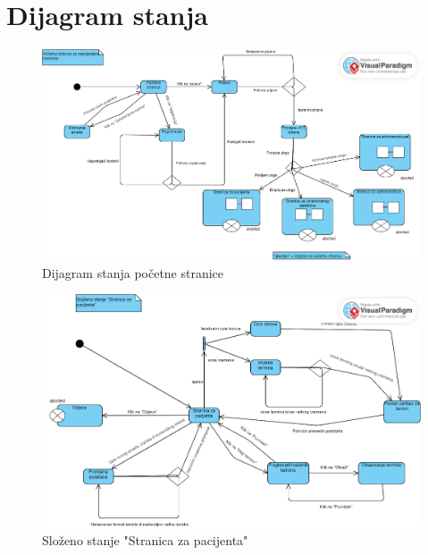 			
			
			\eject
		
		\section{Dijagram stanja}
			
			
		\begin{figure}[H]
			\includegraphics[scale=0.4]{slike/DijagramStanja1.PNG} %
			\centering
			\caption{Dijagram stanja početne stranice}
			\label{fig:promjene}
		\end{figure}
		
			\begin{figure}[H]
			\includegraphics[scale=0.4]{slike/DijagramStanja2.PNG} %
			\centering
			\caption{Složeno stanje "Stranica za pacijenta"}
			\label{fig:promjene}
		\end{figure}
		
